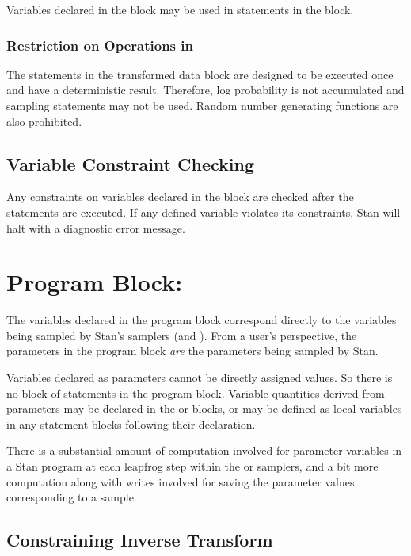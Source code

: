 Variables declared in the  block may be used in statements
in the  block.

\subsubsection{Restriction on Operations in }

The statements in the transformed data block are designed to be
executed once and have a deterministic result.  Therefore, log
probability is not accumulated and sampling statements may not be
used.  Random number generating functions are also prohibited.

\subsection{Variable Constraint Checking}

Any constraints on variables declared in the 
block are checked after the statements are executed.  If any defined
variable violates its constraints, Stan will halt with a diagnostic
error message.


\section{Program Block: }

The variables declared in the  program block
correspond directly to the variables being sampled by Stan's samplers
(\HMC and \NUTS).  From a user's perspective, the parameters in the
program block \emph{are} the parameters being sampled by Stan.

Variables declared as parameters cannot be directly assigned values.
So there is no block of statements in the  program
block.  Variable quantities derived from parameters may be declared in
the  or  blocks,
or may be defined as local variables in any statement blocks following
their declaration.

There is a substantial amount of computation involved for parameter
variables in a Stan program at each leapfrog step within the
\HMC or \NUTS samplers, and a bit more computation along with writes
involved for saving the parameter values corresponding to a sample.

\subsection{Constraining Inverse Transform}


